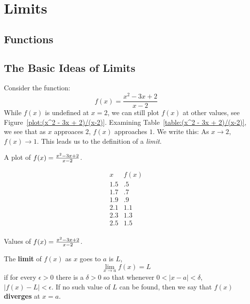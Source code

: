 \chapter{Limits}

\section{Functions}{}{}



\section{The Basic Ideas of Limits}{}{}

Consider the function:
\[
f(x) = \frac{x^2 - 3x + 2}{x-2}
\]
While $f(x)$ is undefined at $x=2$, we can still plot $f(x)$ at other
values, see Figure~\ref{plot:(x^2 - 3x + 2)/(x-2)}. Examining
Table~\ref{table:(x^2 - 3x + 2)/(x-2)}, we see that as $x$ approaces
$2$, $f(x)$ approaches $1$. We write this: As $x \to 2$, $f(x) \to 1$.
This leads us to the definition of a \textit{limit}.

\begin{marginfigure}
  \caption{A plot of $f(x)=\protect\frac{x^2 - 3x + 2}{x-2}$.}
  \label{plot:(x^2 - 3x + 2)/(x-2)}
\end{marginfigure}

\begin{margintable}
\[
\begin{array}{c|c}
 x & f(x) \\ \hline
 1.5 &  .5 \\
 1.7 &  .7 \\
 1.9 &  .9 \\
 2.1 &  1.1 \\
 2.3 &  1.3 \\
 2.5 &  1.5 \\
\end{array}
\]
\caption{Values of $f(x)=\protect\frac{x^2 - 3x + 2}{x-2}$.}
\label{table:(x^2 - 3x + 2)/(x-2)}
\end{margintable}


\begin{definition}\label{def:limit} 
The \textbf{limit} of $f(x)$ as $x$ goes to $a$ is $L$,
\[
\lim_{x\to a}f(x)=L
\] 
if for every $\epsilon>0$ there is a $\delta > 0$ so that whenever $0
< |x-a| < \delta$, $|f(x)-L|<\epsilon$. If no such value of $L$ can be found, then we say that $f(x)$ \textbf{diverges} at $x=a$.
\end{definition}

